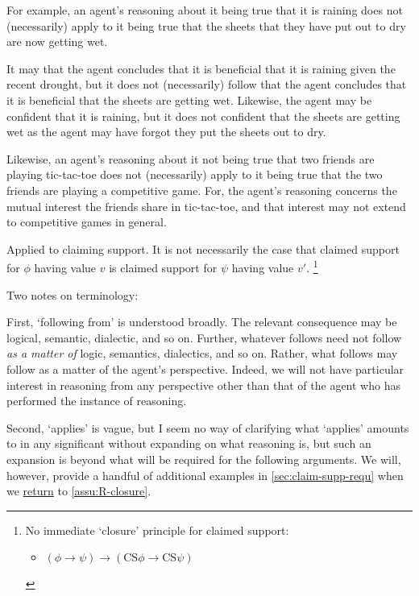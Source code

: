 \begin{note}
  For example, an agent's reasoning about it being true that it is raining does not (necessarily) apply to it being true that the sheets that they have put out to dry are now getting wet.

  It may that the agent concludes that it is beneficial that it is raining given the recent drought, but it does not (necessarily) follow that the agent concludes that it is beneficial that the sheets are getting wet.
  Likewise, the agent may be confident that it is raining, but it does not confident that the sheets are getting wet as the agent may have forgot they put the sheets out to dry.

  Likewise, an agent's reasoning about it not being true that two friends are playing tic-tac-toe does not (necessarily) apply to it being true that the two friends are playing a competitive game.
  For, the agent's reasoning concerns the mutual interest the friends share in tic-tac-toe, and that interest may not extend to competitive games in general.
\end{note}

\begin{note}
  Applied to claiming support.
  It is not necessarily the case that claimed support for \(\phi\) having value \(v\) is claimed support for \(\psi\) having value \(v'\).\nolinebreak
  \footnote{
    No immediate `closure' principle for claimed support:
    \begin{itemize}
    \item \((\phi \rightarrow \psi) \rightarrow (\text{CS}\phi \rightarrow \text{CS}\psi)\)
    \end{itemize}
  }
\end{note}

\begin{note}
  Two notes on terminology:

  First, `following from' is understood broadly.
  The relevant consequence may be logical, semantic, dialectic, and so on.
  Further, whatever follows need not follow \emph{as a matter of} logic, semantics, dialectics, and so on.
  Rather, what follows may follow as a matter of the agent's perspective.
  Indeed, we will not have particular interest in reasoning from any perspective other than that of the agent who has performed the instance of reasoning.

  Second, `applies' is vague, but I seem no way of clarifying what `applies' amounts to in any significant without expanding on what reasoning is, but such an expansion is beyond what will be required for the following arguments.
  We will, however, provide a handful of additional examples in \autoref{sec:claim-supp-requ} when we \hyperref[independence-and-assu:R-closure]{return} to \autoref{assu:R-closure}.
\end{note}

